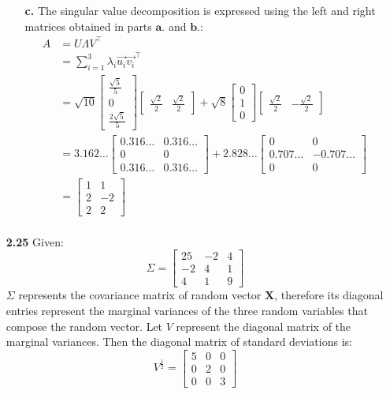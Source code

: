 \documentclass[oneside,12pt,letterpaper]{article}
\newcommand\m[1]{\begin{bmatrix}#1\end{bmatrix}}
\begin{document}
\begin{enumerate}
\begin{enumerate}
				\item[\textbf{c.}]
					The singular value decomposition is expressed using the left and right matrices obtained in parts $\textbf{a.}$ and $\textbf{b.}$:
					\begin{align*}
						A &= U \Lambda V^{\intercal} \\
							&= \sum_{i=1}^{3} \lambda_{i} \vec{u_{i}} \vec{v_{i}}^{\intercal} \\
							&= \sqrt{10} 
							\begin{bmatrix}
								\frac{\sqrt{5}}{5} \\
								0 \\
								\frac{2\sqrt{5}}{5}
							\end{bmatrix} 
							\begin{bmatrix}
								\frac{\sqrt{2}}{2} & \frac{\sqrt{2}}{2}
							\end{bmatrix} + \sqrt{8} 
							\begin{bmatrix}
								0 \\
								1 \\
								0
							\end{bmatrix} 
							\begin{bmatrix}
								\frac{\sqrt{2}}{2} & - \frac{\sqrt{2}}{2}
							\end{bmatrix} \\
							&= 3.162 \ldots
							\begin{bmatrix}
								0.316 \ldots & 0.316 \ldots \\
								0 & 0 \\
								0.316 \ldots & 0.316 \ldots
							\end{bmatrix} + 2.828 \ldots
							\begin{bmatrix}
								0 & 0 \\
								0.707 \ldots & -0.707 \ldots \\
								0 & 0
							\end{bmatrix} \\
							&= \begin{bmatrix}
								1 & 1 \\
								2 & -2 \\
								2 & 2
							\end{bmatrix} \\
						\end{align*}
			\end{enumerate}

		\pagebreak
		\item[\textbf{2.25}]
			Given: $$\Sigma = \m{25&-2&4\\-2&4&1\\4&1&9}$$ $\Sigma$ represents the covariance matrix of random vector $\textbf{X}$, therefore its diagonal entries represent the marginal variances of the three random variables that compose the random vector. Let $V$ represent the diagonal matrix of the marginal variances. Then the diagonal matrix of standard deviations is: $$V^{\frac{1}{2}}=\m{5&0&0\\0&2&0\\0&0&3}$$


\end{enumerate}
\end{document}
